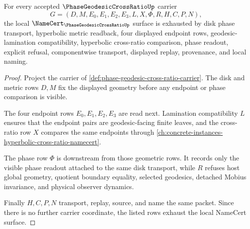 \begin{theorem}
\label{thm:phase-geodesic-cross-ratio-namecert-obligations}
For every accepted $\PhaseGeodesicCrossRatioUp$ carrier
$$
G=(D,M,E_0,E_1,E_2,E_3,L,X,\Phi,R,H,C,P,N),
$$
the local $\NameCert_{\PhaseGeodesicCrossRatioUp}$ surface is exhausted by disk phase transport, hyperbolic metric readback, four displayed endpoint rows, geodesic-lamination compatibility, hyperbolic cross-ratio comparison, phase readout, explicit refusal, componentwise transport, displayed replay, provenance, and local naming.
\end{theorem}
\begin{proof}
Project the carrier of \autoref{def:phase-geodesic-cross-ratio-carrier}. The disk and metric rows $D,M$ fix the displayed geometry before any endpoint or phase comparison is visible.

The four endpoint rows $E_0,E_1,E_2,E_3$ are read next. Lamination compatibility $L$ ensures that the endpoint pairs are geodesic-facing finite leaves, and the cross-ratio row $X$ compares the same endpoints through \autoref{ch:concrete-instances-hyperbolic-cross-ratio-namecert}.

The phase row $\Phi$ is downstream from those geometric rows. It records only the visible phase readout attached to the same disk transport, while $R$ refuses host global geometry, quotient boundary equality, selected geodesics, detached Mobius invariance, and physical observer dynamics.

Finally $H,C,P,N$ transport, replay, source, and name the same packet. Since there is no further carrier coordinate, the listed rows exhaust the local NameCert surface.
\end{proof}


